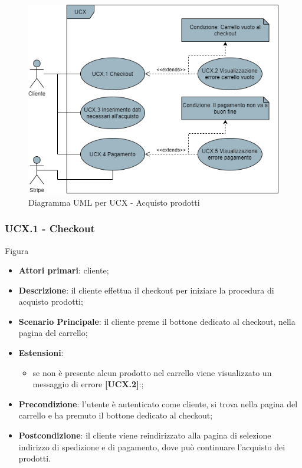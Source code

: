 \begin{figure}[H]
\centering
\includegraphics[scale=0.6]{res/UseCase/Immagini/AcquistoProdotti}
\caption{Diagramma UML per UCX - Acquisto prodotti}
\end{figure}

\subsubsection{UCX.1 - Checkout}
Figura \\
\begin{itemize}
\item \textbf{Attori primari}: cliente;
\item \textbf{Descrizione}: il cliente effettua il checkout per iniziare la procedura di acquisto prodotti;
\item \textbf{Scenario Principale}: il cliente preme il bottone dedicato al checkout, nella pagina del carrello;
\item \textbf{Estensioni}:
\begin{itemize}
\item se non è presente alcun prodotto nel carrello viene visualizzato un messaggio di errore \textbf{[UCX.2]}:;
\end{itemize}
\item \textbf{Precondizione}: l'utente è autenticato come cliente, si trova nella pagina del carrello e ha premuto il bottone dedicato al checkout;
\item \textbf{Postcondizione}: il cliente viene reindirizzato alla pagina di selezione indirizzo di spedizione e di pagamento, dove può continuare l'acquisto dei prodotti.
\end{itemize}

